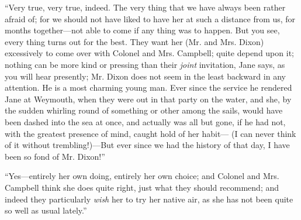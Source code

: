 “Very true, very true, indeed. The very thing that we have always been rather afraid of; for we should not have liked to have her at such a distance from us, for months together---not able to come if any thing was to happen. But you see, every thing turns out for the best. They want her (Mr. and Mrs. Dixon) excessively to come over with Colonel and Mrs. Campbell; quite depend upon it; nothing can be more kind or pressing than their {\em joint} invitation, Jane says, as you will hear presently; Mr. Dixon does not seem in the least backward in any attention. He is a most charming young man. Ever since the service he rendered Jane at Weymouth, when they were out in that party on the water, and she, by the sudden whirling round of something or other among the sails, would have been dashed into the sea at once, and actually was all but gone, if he had not, with the greatest presence of mind, caught hold of her habit--- (I can never think of it without trembling!)---But ever since we had the history of that day, I have been so fond of Mr. Dixon!”


“Yes---entirely her own doing, entirely her own choice; and Colonel and Mrs. Campbell think she does quite right, just what they should recommend; and indeed they particularly {\em wish} her to try her native air, as she has not been quite so well as usual lately.”





